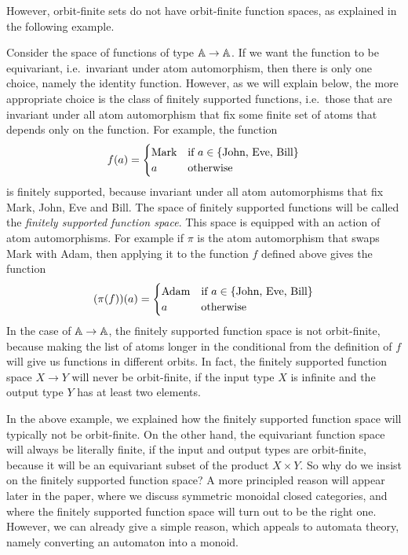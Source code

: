 However, orbit-finite sets do not have orbit-finite function spaces, as explained in the following example. 

\begin{example}
    Consider the space of functions of type $\mathbb A \to \mathbb A$. If we want the function to be equivariant, i.e.~invariant under atom automorphism, then there is only one choice, namely the identity function. However, as we will explain below, the more appropriate choice is the class of finitely supported functions, i.e.~those that are invariant under all atom automorphism that fix some finite set of atoms that depends only on the function. For example,  the  function
    \begin{align*}
    f(a) = \begin{cases}
        \text{Mark} & \text{if $a \in \{\text{John, Eve, Bill}\}$} \\
        a & \text{otherwise}
    \end{cases}
    \end{align*}
    is finitely supported, because invariant under all atom automorphisms that fix Mark, John, Eve and Bill. The space of finitely supported functions will be called the \emph{finitely supported function space}. This space is equipped with an action of atom automorphisms. For example if $\pi$ is the atom automorphism that swaps Mark with Adam, then applying it to the function $f$ defined above gives the function
    \begin{align*}
        (\pi(f))(a) = \begin{cases}
            \text{Adam} & \text{if $a \in \{\text{John, Eve, Bill}\}$} \\
            a & \text{otherwise}
        \end{cases}
        \end{align*}
    In the case of $\mathbb A \to \mathbb A$, the finitely supported function space is not orbit-finite, because making the list of atoms longer in the conditional from the definition of $f$ will give us functions in different orbits. In fact, the finitely supported function space $X \to Y$ will never be orbit-finite, if the input type $X$ is infinite and the output type $Y$ has at least two elements. 
\end{example}

In the above example, we explained how the finitely supported function space will typically not be orbit-finite. On the other hand, the equivariant function space will always be literally finite, if the input and output types are orbit-finite, because it will be an equivariant subset of the product $X \times Y$. So why do we insist on the finitely supported function space? A more principled reason will appear later in the paper, where we discuss symmetric monoidal closed categories, and where the finitely supported function space will turn out to be the right one. However, we can already give a simple reason, which appeals to automata theory, namely converting an automaton into a monoid. 


